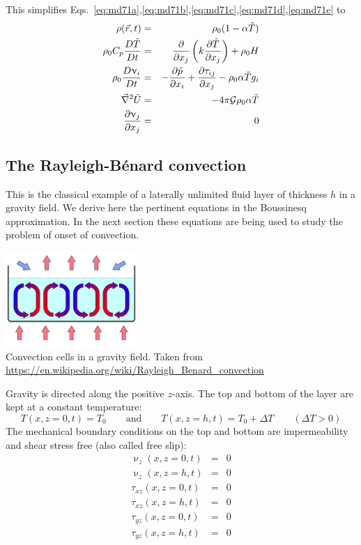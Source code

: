This simplifies Eqs.~\eqref{eq:md71a},\eqref{eq:md71b},\eqref{eq:md71c},\eqref{eq:md71d},\eqref{eq:md71e} 
to
\begin{eqnarray}
\rho(\vec{r},t) &=& \rho_0 (1-\alpha {\tilde T}) \\
\rho_0 C_p \frac{D {\tilde T} }{Dt} &=& \frac{\partial}{\partial x_j}
\left( k \frac{\partial {\tilde T}}{\partial x_j}  \right) + \rho_0 H \\
\rho_0 \frac{D\upnu_i}{Dt} &=& -\frac{\partial {\tilde p}}{\partial x_i}
+\frac{\partial \tau_{ij}}{\partial x_j} - \rho_0 \alpha {\tilde T} g_i \\
\vec\nabla^2 {\tilde U} &=& -4 \pi {\cal G} \rho_0 \alpha {\tilde T} \\
\frac{\partial \upnu_j}{\partial x_j} &=& 0
\end{eqnarray}

\subsection{The Rayleigh-B{\'e}nard convection}

This is the classical example of a laterally unlimited fluid layer of thickness $h$ in a gravity
field. We derive here the pertinent equations in the Boussinesq approximation.
In the next section these equations are being used to study the
problem of onset of convection.

\begin{center}
\includegraphics[width=5cm]{images/chapter_md/RBconv}\\
{\captionfont Convection cells in a gravity field. Taken from \url{https://en.wikipedia.org/wiki/Rayleigh_Benard_convection}}
\end{center}

Gravity is directed along the positive $z$-axis. The top and bottom of the layer are kept at a
constant temperature:
\begin{equation}
T(x,z=0,t)=T_0 
\qquad
\text{and}
\qquad
T(x,z=h,t)=T_0 + \Delta T \qquad (\Delta T>0)
\end{equation}
The mechanical boundary conditions on the top and bottom are impermeability and shear
stress free (also called free slip):
\begin{eqnarray}
\upnu_z(x,z=0,t) &=& 0 \\
\upnu_z(x,z=h,t) &=& 0 \\
\tau_{xz}(x,z=0,t) &=& 0 \\
\tau_{xz}(x,z=h,t) &=& 0 \\
\tau_{yz}(x,z=0,t) &=& 0 \\
\tau_{yz}(x,z=h,t) &=& 0 
\end{eqnarray}

